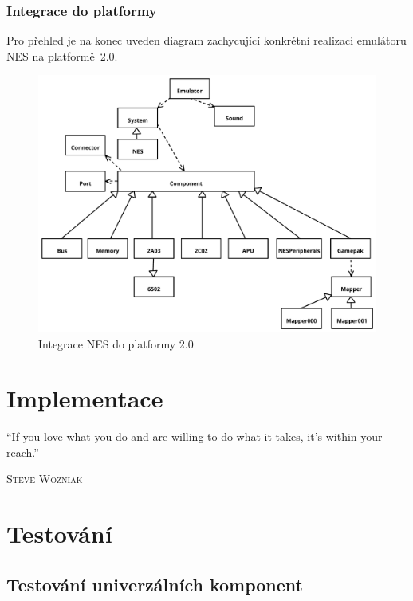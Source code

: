 \subsection{Integrace do platformy}
Pro přehled je na konec uveden diagram zachycující konkrétní realizaci emulátoru NES na platformě~2.0.

\begin{figure}[htp!]
	\centering
	\caption{Integrace NES do platformy 2.0}\label{fig:navrh-prehled}
	\includegraphics[width=1.0\textwidth]{images/navrh_prehled.pdf}
\end{figure}


\chapter{Implementace}
\epigraph{
	\enquote{If you love what you do and are willing to do what it takes, it's within your reach.}
}{\textsc{Steve Wozniak}}

\chapter{Testování}

\section{Testování univerzálních komponent}

